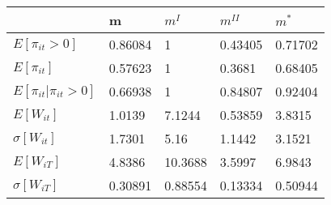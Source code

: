 \begin{tabular}{lllll}
& m & $m^I$ & $m^{II}$ & $m^*$ \\ 
\hline 
$E[\pi_{it}>0]$ & 0.86084 & 1 & 0.43405 & 0.71702 \\ 
$E[\pi_{it}]$ & 0.57623 & 1 & 0.3681 & 0.68405 \\ 
$E[\pi_{it}|\pi_{it}>0]$ & 0.66938 & 1 & 0.84807 & 0.92404 \\ 
$E[W_{it}]$ & 1.0139 & 7.1244 & 0.53859 & 3.8315 \\ 
$\sigma[W_{it}]$ & 1.7301 & 5.16 & 1.1442 & 3.1521 \\ 
$E[W_{iT}]$ & 4.8386 & 10.3688 & 3.5997 & 6.9843 \\ 
$\sigma[W_{iT}]$ & 0.30891 & 0.88554 & 0.13334 & 0.50944 \\ 
\hline 
\end{tabular}